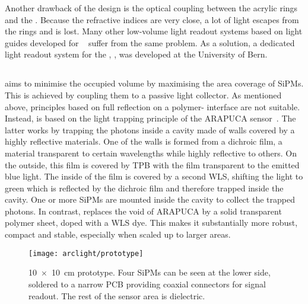 Another drawback of the design is the optical coupling between the acrylic rings and the \lar{}.
Because the refractive indices are very close, a lot of light escapes from the rings and is lost.
Many other low-volume light readout systems based on light guides developed for \lar{}~\cite{lar_lro1, lar_lro2, lar_lro3, lar_lro4, lar_lro5, lar_lro6, lar_lro7} suffer from the same problem.
As a solution, a dedicated light readout system for the \AC{}, \AL{}, was developed at the University of Bern.

\afterpage{\clearpage}


\subsection{\AL{}}
\label{sec:studies_light-col_al}

\AL{} aims to minimise the occupied volume by maximising the area coverage of SiPMs.
This is achieved by coupling them to a passive light collector.
As mentioned above, principles based on full reflection on a polymer-\lar{} interface are not suitable.
Instead, \AL{} is based on the light trapping principle of the ARAPUCA sensor~\cite{arapuca}.
The latter works by trapping the photons inside a cavity made of walls covered by a highly reflective materials.
One of the walls is formed from a dichroic film, a material transparent to certain wavelengths while highly reflective to others.
On the outside, this film is covered by TPB with the film transparent to the emitted blue light.
The inside of the film is covered by a second WLS, shifting the light to green which is reflected by the dichroic film and therefore trapped inside the cavity.
One or more SiPMs are mounted inside the cavity to collect the trapped photons.
In contrast, \AL{} replaces the void of ARAPUCA by a solid transparent polymer sheet, doped with a WLS dye.
This makes it substantially more robust, compact and stable, especially when scaled up to larger areas.

\begin{figure}[htb]
	\centering
	\texttt{[image: arclight/prototype]}
	\caption{\SI{10 x 10}{\centi\metre} \AL{} prototype.
		Four SiPMs can be seen at the lower side, soldered to a narrow PCB providing coaxial connectors for signal readout.
		The rest of the sensor area is dielectric.}
	\label{fig:arclight_prototype}
\end{figure}

